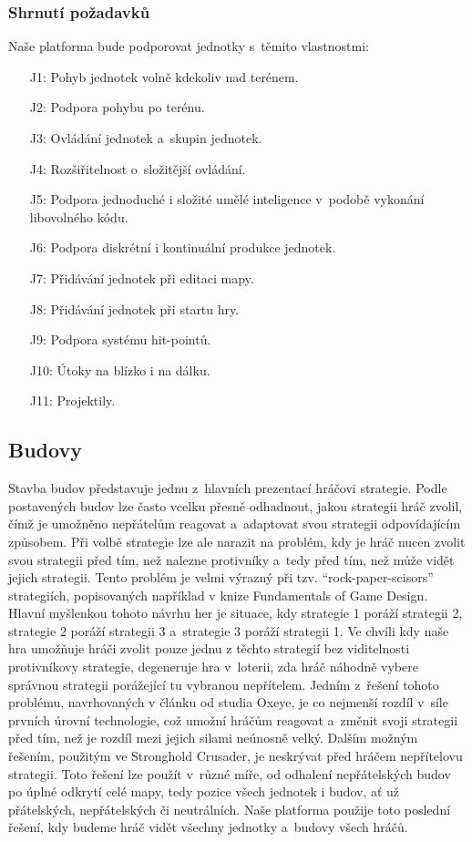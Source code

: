 \subsubsection{Shrnutí požadavků}
Naše platforma bude podporovat jednotky s~těmito vlastnostmi:
\begin{itemize}
	\item[J1:] Pohyb jednotek volně kdekoliv nad terénem.
	\item[J2:] Podpora pohybu po terénu.
	\item[J3:] Ovládání jednotek a~skupin jednotek.
	\item[J4:] Rozšiřitelnost o~složitější ovládání.
	\item[J5:] Podpora jednoduché i složité umělé inteligence v~podobě vykonání libovolného kódu.
	\item[J6:] Podpora diskrétní i kontinuální produkce jednotek.
	\item[J7:] Přidávání jednotek při editaci mapy.
	\item[J8:] Přidávání jednotek při startu hry.
	\item[J9:] Podpora systému hit-pointů.
	\item[J10:] Útoky na blízko i na dálku.
	\item[J11:] Projektily.
\end{itemize}

\done
{}
\subsection{Budovy}
\label{sec:budovy}
Stavba budov představuje jednu z~hlavních prezentací hráčovi strategie. Podle postavených budov lze často vcelku přesně odhadnout, jakou strategii hráč zvolil, čímž je umožněno nepřátelům reagovat a~adaptovat svou strategii odpovídajícím způsobem. 
Při volbě strategie lze ale narazit na problém, kdy je hráč nucen zvolit svou strategii před tím, než nalezne protivníky a~tedy před tím, než může vidět jejich strategii. Tento problém je velmi výrazný při tzv.  ``rock-paper-scisors'' strategiích, popisovaných například v knize Fundamentals of Game Design\citep[str.~329]{book:gamefund}. Hlavní myšlenkou tohoto návrhu her je situace, kdy strategie 1 poráží strategii 2, strategie 2 poráží strategii 3 a~strategie 3 poráží strategii 1. Ve chvíli kdy naše hra umožňuje hráči zvolit pouze jednu z těchto strategií bez viditelnosti protivníkovy strategie, degeneruje hra v~loterii, zda hráč náhodně vybere správnou strategii porážející tu vybranou nepřítelem. Jedním z~řešení tohoto problému, navrhovaných v článku od studia Oxeye\citep{site:oxeye03}, je co nejmenší rozdíl v~síle prvních úrovní technologie, což umožní hráčům reagovat a~změnit svoji strategii před tím, než je rozdíl mezi jejich silami neúnosně velký. Dalším možným řešením, použitým ve Stronghold Crusader\citep{site:strongholdcrus}, je neskrývat před hráčem nepřítelovu strategii. Toto řešení lze použít v~různé míře, od odhalení nepřátelských budov po úplné odkrytí celé mapy, tedy pozice všech jednotek i budov, ať už přátelských, nepřátelských či neutrálních. Naše platforma použije toto poslední řešení, kdy budeme hráč vidět všechny jednotky a~budovy všech hráčů.

